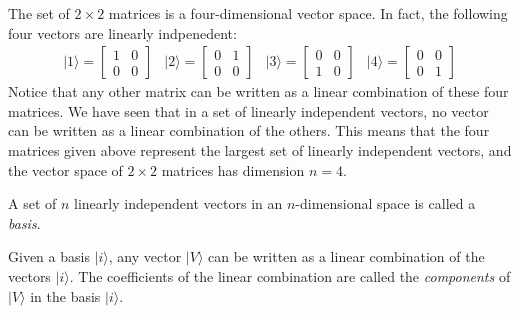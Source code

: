 \documentclass[11pt,fleqn]{book} %
\newcommand{\ket}[1]{| #1\rangle}
\begin{document}
\begin{example}
    The set of $2 \times 2$ matrices is a four-dimensional vector space. In fact, the following four vectors are linearly indpenedent:
    \begin{equation*}
        \begin{array}{cccc}
            \ket{1}=\left[
                \begin{array}{cc}
                    1&0\\
                    0&0
                \end{array}
        \right] &
        \ket{2}=\left[
            \begin{array}{cc}
                0&1\\
                0&0
            \end{array}
        \right] &
        \ket{3}=\left[
            \begin{array}{cc}
                0&0\\
                1&0
            \end{array}
        \right] &
        \ket{4}=\left[
            \begin{array}{cc}
                0&0\\
                0&1
            \end{array}
        \right]
        \end{array}
    \end{equation*} 
    Notice that any other matrix can be written as a linear combination of these four matrices. We have seen that in a set of linearly
    independent vectors, no vector can be written as a linear combination of the others. This means that the four matrices given above 
    represent the largest set of linearly independent vectors, and the vector space of $2\times 2$ matrices has dimension $n=4$.
\end{example}

\begin{definition}[Basis]
    A set of $n$ linearly independent vectors in an $n$-dimensional space is called a \textit{basis}.
\end{definition}

\begin{definition}[Component]
    Given a basis $\ket{i}$, any vector $\ket{V}$ can be written as a linear combination of the vectors $\ket{i}$. The coefficients of the
    linear combination are called the \textit{components} of $\ket{V}$ in the basis $\ket{i}$.
\end{definition}
\end{document}
